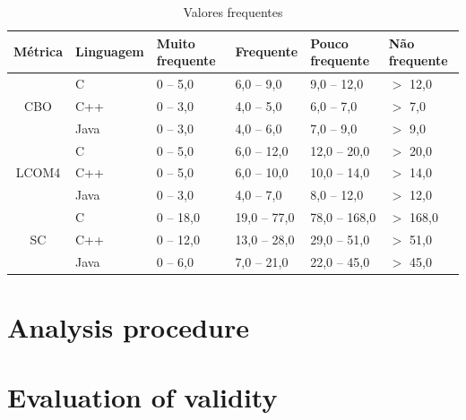 \begin{table}[H]
  \caption{Valores frequentes\cite{Meirelles2013}}
  \centering
  \begin{tabular}{| c | l | l | l | l | l |}
    \hline
    Métrica           & Linguagem & Muito frequente & Frequente & Pouco frequente & Não frequente \\
    \hline
\multirow{3}{*}{CBO}   & C         & 0 -- 5,0   & 6,0 -- 9,0   & 9,0 -- 12,0  & $>$ 12,0  \\
                       & C++       & 0 -- 3,0   & 4,0 -- 5,0   & 6,0 -- 7,0   & $>$ 7,0   \\
                       & Java      & 0 -- 3,0   & 4,0 -- 6,0   & 7,0 -- 9,0   & $>$ 9,0   \\
    \hline
\multirow{3}{*}{LCOM4} & C         & 0 -- 5,0   & 6,0 -- 12,0  & 12,0 -- 20,0 & $>$ 20,0  \\
                       & C++       & 0 -- 5,0   & 6,0 -- 10,0  & 10,0 -- 14,0 & $>$ 14,0  \\
                       & Java      & 0 -- 3,0   & 4,0 -- 7,0   & 8,0 -- 12,0  & $>$ 12,0  \\
    \hline
\multirow{3}{*}{SC}    & C         & 0 -- 18,0  & 19,0 -- 77,0 & 78,0 -- 168,0 & $>$ 168,0 \\
                       & C++       & 0 -- 12,0  & 13,0 -- 28,0 & 29,0 -- 51,0  & $>$ 51,0  \\
                       & Java      & 0 -- 6,0   & 7,0 -- 21,0  & 22,0 -- 45,0  & $>$ 45,0  \\
    \hline
  \end{tabular}
  \label{valores-frequentes}
\end{table}

\section{Analysis procedure}

\section{Evaluation of validity}
